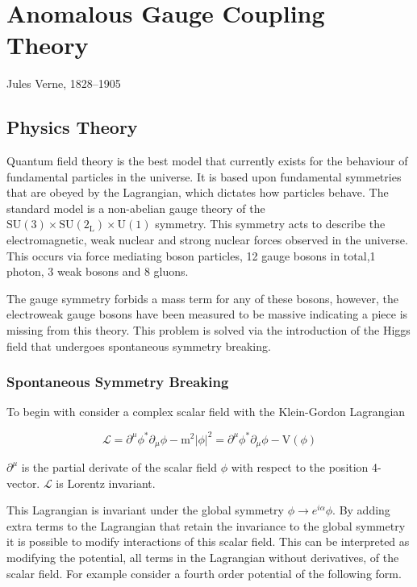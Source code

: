\chapter{Anomalous Gauge Coupling Theory}
\label{chap:anomalousgaugecouplingtheory}

{Jules Verne, 1828--1905}

\section{Physics Theory}
Quantum field theory is the best model that currently exists for the behaviour of fundamental particles in the universe.  It is based upon fundamental symmetries that are obeyed by the Lagrangian, which dictates how particles behave.  The standard model is a non-abelian gauge theory of the $\text{SU}(3) \times \text{SU}(2_{\text{L}}) \times \text{U}(1)$ symmetry.  This symmetry acts to describe the electromagnetic, weak nuclear and strong nuclear forces observed in the universe.  This occurs via force mediating boson particles, 12 gauge bosons in total,1 photon, 3 weak bosons and 8 gluons.  

The gauge symmetry forbids a mass term for any of these bosons, however, the electroweak gauge bosons have been measured to be massive indicating a piece is missing from this theory.  This problem is solved via the introduction of the Higgs field that undergoes spontaneous symmetry breaking.

\subsection{Spontaneous Symmetry Breaking}
To begin with consider a complex scalar field \phi with the Klein-Gordon Lagrangian

\begin{equation}
\mathcal{L} = \partial^{\mu} \phi^{*} \partial_{\mu} \phi - \text{m}^{2} |\phi|^{2} = \partial^{\mu} \phi^{*} \partial_{\mu} \phi - \text{V}(\phi)
\end{equation}

$\partial^{\mu}$ is the partial derivate of the scalar field $\phi$ with respect to the position 4-vector.  $\mathcal{L}$ is Lorentz invariant.

This Lagrangian is invariant under the global symmetry $\phi \rightarrow e^{i\alpha} \phi$.  By adding extra terms to the Lagrangian that retain the invariance to the global symmetry it is possible to modify interactions of this scalar field.  This can be interpreted as modifying the potential, all terms in the Lagrangian without derivatives, of the scalar field.  For example consider a fourth order potential of the following form.

